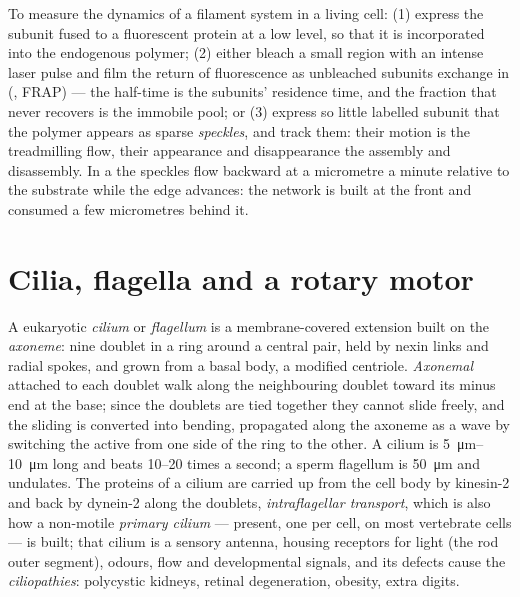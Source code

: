 \begin{method}\label{met:b3:cytoskeleton-motility:frap}
To measure the dynamics of a filament system in a living cell: (1)
express the subunit fused to a fluorescent protein at a low level, so
that it is incorporated into the endogenous polymer; (2) either bleach
a small region with an intense laser pulse and film the return of
fluorescence as unbleached subunits exchange in (\emph{}, FRAP) --- the half-time is the
subunits' residence time, and the fraction that never recovers is the
immobile pool; or (3) express so little labelled subunit that the
polymer appears as sparse \emph{speckles}, and track them: their
motion is the treadmilling flow, their appearance and disappearance
the assembly and disassembly. In a  the speckles flow
backward at a micrometre a minute relative to the substrate while the
edge advances: the network is built at the front and consumed a few
micrometres behind it.
\end{method}

\section{Cilia, flagella and a rotary motor}

\begin{definition}\label{def:b3:cytoskeleton-motility:cilia}
A eukaryotic \emph{cilium} or \emph{flagellum} is a membrane-covered
extension built on the \emph{axoneme}: nine doublet  in a
ring around a central pair, held by nexin links and radial spokes, and
grown from a basal body, a modified centriole. \emph{Axonemal }
attached to each doublet walk along the neighbouring doublet toward its
minus end at the base; since the doublets are tied together they cannot
slide freely, and the sliding is converted into bending, propagated
along the axoneme as a wave by switching the active  from one
side of the ring to the other. A cilium is \qtyrange{5}{10}{\micro m}
long and beats \numrange{10}{20} times a second; a sperm flagellum is
\qty{50}{\micro m} and undulates. The proteins of a cilium are carried
up from the cell body by kinesin-2 and back by dynein-2 along the
doublets, \emph{intraflagellar transport}, which is also how a
non-motile \emph{primary cilium} --- present, one per cell, on most
vertebrate cells --- is built; that cilium is a sensory antenna,
housing receptors for light (the rod outer segment), odours, flow and
developmental signals, and its defects cause the \emph{ciliopathies}:
polycystic kidneys, retinal degeneration, obesity, extra digits.
\end{definition}

